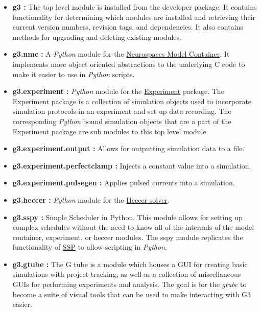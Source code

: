 \documentclass[12pt]{article}
\begin{document}
\begin{itemize}

\item[] {\bf g3 :}  The top level module is installed from the developer package. It contains functionality for determining which modules are installed and retrieving their current version numbers, revision tags, and dependencies. It also contains methods for upgrading and deleting existing modules. 

\item[] {\bf g3.nmc :} A {\it Python} module for the \href{../model-container/model-container.tex}{Neurospaces Model Container}. It implements more object oriented abstractions to the underlying C code to make it easier to use in {\it Python} scripts.

\item[]{\bf g3.experiment :}  {\it Python} module for the \href{../experiment/experiment.tex}{Experiment} package. The Experiment package is a collection of simulation objects used to incorporate simulation protocols in an experiment and set up data recording. The corresponding {\it Python} bound simulation objects that are a part of the Experiment package are sub modules to this top level module.

\item[]{\bf g3.experiment.output :} Allows for outputting simulation data to a file.

\item[]{\bf g3.experiment.perfectclamp :} Injects a constant value into a simulation.

\item[]{\bf g3.experiment.pulsegen :} Applies pulsed currents into a simulation.

\item[]{\bf g3.heccer :} {\it Python} module for the \href{../heccer/heccer.tex}{Heccer solver}. 

\item []{\bf g3.sspy :} Simple Scheduler in Python. This module allows for setting up complex schedules without the need to know all of the internals of the model container, experiment, or heccer modules. The sspy module replicates the functionality of \href{../ssp/ssp.tex}{SSP} to allow scripting in {\it Python}.

\item[]{\bf g3.gtube :} The G tube is a module which houses a GUI for creating basic simulations with project tracking, as well as a collection of miscellaneous GUIs for performing experiments and analysis. The goal is for the {\it gtube} to become a suite of visual tools that can be used to make interacting with G3 easier.

\end{itemize}
    
\end{document}
